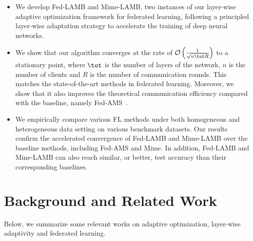 \documentclass[nohyperref]{article}
\theoremstyle{plain}
\theoremstyle{definition}
\theoremstyle{remark}
\begin{document}
\begin{itemize}
\item We develop Fed-LAMB and Mime-LAMB, two instances of our layer-wise adaptive optimization framework for federated learning, following a principled layer-wise adaptation strategy to accelerate the training of deep neural networks. 


\item We show that our algorithm converges at the rate of $\mathcal{O}\left(\frac{1}{\sqrt{n\tot R}} \right)$ to a stationary point, where $\tot$ is the number of layers of the network, $n$ is the number of clients and $R$ is the number of communication rounds. This matches the state-of-the-art methods in federated learning. Moreover, we show that it also improves the theoretical communication efficiency compared with the baseline, namely Fed-AMS~\cite{chen2020toward}.

\item We empirically compare various FL methods under both homogeneous and heterogeneous data setting on various benchmark datasets. 
Our results confirm the accelerated convergence of Fed-LAMB and Mime-LAMB over the baseline methods, including Fed-AMS and Mime. 
In addition, Fed-LAMB and Mine-LAMB can also reach similar, or better, test accuracy than their corresponding baselines.
\end{itemize}



\section{Background and Related Work}\label{sec:related}

Below, we summarize some relevant works on adaptive optimization, layer-wise adaptivity and federated learning.
\end{document}
